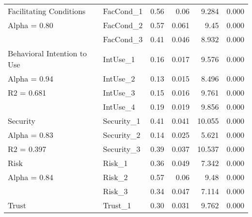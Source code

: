 \begin{table}[htpb]
{\begin{tabular}{llrrrl}
Facilitating Conditions     & FacCond\_1  & 0.56                      & 0.06                         & 9.284                       & 0.000   \\
Alpha = 0.80                & FacCond\_2  & 0.57                      & 0.061                        & 9.45                        & 0.000   \\
                            & FacCond\_3  & 0.41                      & 0.046                        & 8.932                       & 0.000   \\ \hline
Behavioral Intention to Use & IntUse\_1   & 0.16                      & 0.017                        & 9.576                       & 0.000   \\
Alpha = 0.94                & IntUse\_2   & 0.13                      & 0.015                        & 8.496                       & 0.000   \\
R2 = 0.681                  & IntUse\_3   & 0.15                      & 0.016                        & 9.761                       & 0.000   \\
                            & IntUse\_4   & 0.19                      & 0.019                        & 9.856                       & 0.000   \\ \hline
Security                    & Security\_1 & 0.41                      & 0.041                        & 10.055                      & 0.000   \\
Alpha = 0.83                & Security\_2 & 0.14                      & 0.025                        & 5.621                       & 0.000   \\
R2 = 0.397                  & Security\_3 & 0.39                      & 0.037                        & 10.537                      & 0.000   \\ \hline
Risk                        & Risk\_1  & 0.36                         & 0.049                        & 7.342                       & 0.000   \\
Alpha = 0.84                & Risk\_2  & 0.57                         & 0.06                         & 9.48                        & 0.000   \\
                            & Risk\_3  & 0.34                         & 0.047                        & 7.114                       & 0.000   \\ \hline
Trust                       & Trust\_1    & 0.30                      & 0.031                        & 9.762                       & 0.000   \\

\end{tabular}}
\end{table}

